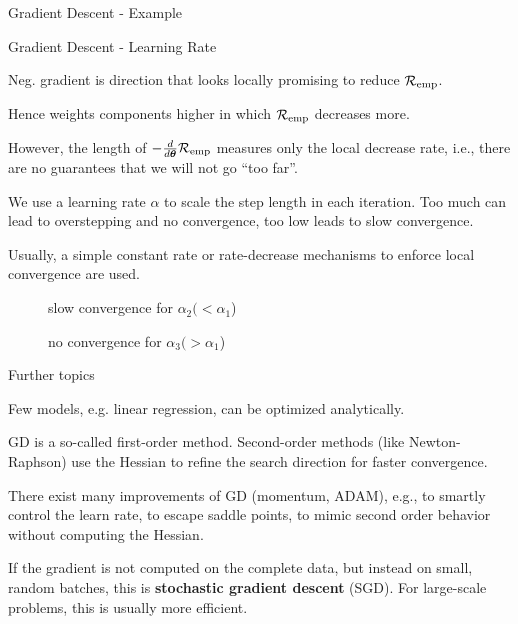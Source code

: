 \documentclass[11pt,compress,t,notes=noshow, xcolor=table]{beamer}
\begin{document}
\begin{frame2}{Gradient Descent - Example}
\vfill
{}
\end{frame2}


\begin{framei}[fs=footnotesize]{Gradient Descent - Learning Rate}
\item Neg. gradient is direction that looks locally promising to reduce $\mathcal{R}_{\text{emp}}$.
\item Hence weights components higher in which $\mathcal{R}_{\text{emp}}$ decreases more.
\item However, the length of $-\frac{d}{d\bm{\theta}}{\mathcal{R}_{\text{emp}}}$ measures only the local decrease rate, i.e., there are no guarantees that we will not go ``too far''.
\item We use a learning rate $\alpha$ to scale the step length in each iteration. Too much can lead to overstepping and no convergence, too low leads to slow convergence.
\item Usually, a simple constant rate or rate-decrease mechanisms to enforce local convergence are used.
\begin{figure}[!htb]
{
\caption*{\tiny slow convergence for $\alpha_2 (< \alpha_1$)}
}
{
\caption*{\tiny no convergence for $\alpha_3 (> \alpha_1$)}
}
\end{figure}
\end{framei}

\begin{framei}{Further topics}
\item Few models, e.g. linear regression, can be optimized analytically. 
\item GD is a so-called first-order method. Second-order methods (like Newton-Raphson) use the Hessian to refine the search direction for faster convergence.
\item There exist many improvements of GD (momentum, ADAM), e.g., to smartly control the learn rate, to escape saddle points, to mimic second order behavior without computing the Hessian.
\item If the gradient is not computed on the complete data, but instead on small, random batches, this is \textbf{stochastic gradient descent} (SGD). For large-scale problems, this is usually more efficient.
\end{framei}

\endlecture
\end{document}
